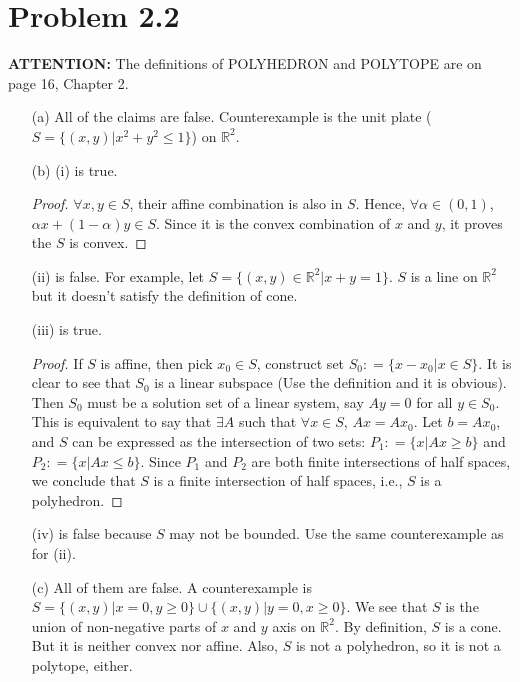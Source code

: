 \documentclass[12pt]{article}
\begin{document}
\section*{Problem 2.2}

\textbf{\color{red}ATTENTION: } The definitions of POLYHEDRON and POLYTOPE are on page 16, Chapter 2.

\begin{enumerate}
\item [(a)]
All of the claims are false. Counterexample is the unit plate ($S = \{(x, y) | x^2 + y^2 \leqslant 1\}$) on $\mathbb{R}^2$.

\vspace{50mm}

\item [(b)]
(i) is true. 
\begin{proof}

$\forall x, y \in S$, their affine combination is also in $S$. Hence, $\forall \alpha \in (0, 1)$, $\alpha x + (1-\alpha) y \in S$. Since it is the convex combination of $x$ and $y$, it proves the $S$ is convex.

\end{proof}

(ii) is false. For example, let $S = \{(x, y) \in \mathbb{R}^2 | x + y = 1\}$. $S$ is a line on $\mathbb{R}^2$ but it doesn't satisfy the definition of cone. 

\vspace{50mm}

(iii) is true. 
\begin{proof}

If $S$ is affine, then pick $x_0 \in S$, construct set $S_0: = \{x-x_0 | x \in S\} $. It is clear to see that $S_0$ is a linear subspace (Use the definition and it is obvious). Then $S_0$ must be a solution set of a linear system, say $Ay = 0$ for all $y \in S_0$. This is equivalent to say that $\exists A$ such that $\forall x\in S$, $Ax = Ax_0$. Let $b = Ax_0$, and $S$ can be expressed as the intersection of two sets: $P_1 : = \{x | Ax \geqslant b\}$ and $P_2 : = \{x | Ax \leqslant b\}$. Since $P_1$ and $P_2$ are both finite intersections of half spaces, we conclude that $S$ is a finite intersection of half spaces, i.e., $S$ is a polyhedron. 

\end{proof}

(iv) is false because $S$ may not be bounded. Use the same counterexample as for (ii).


\item[(c)] 
All of them are false. A counterexample is $S = \{(x, y)| x = 0, y \geqslant 0 
\} \cup \{(x, y)| y = 0, x \geqslant 0 \} $. We see that $S$ is the union of non-negative parts of $x$ and $y$ axis on $\mathbb{R}^2$. By definition, $S$ is a cone. But it is neither convex nor affine. Also, $S$ is not a polyhedron, so it is not a polytope, either. 


\end{enumerate}
\end{document}
